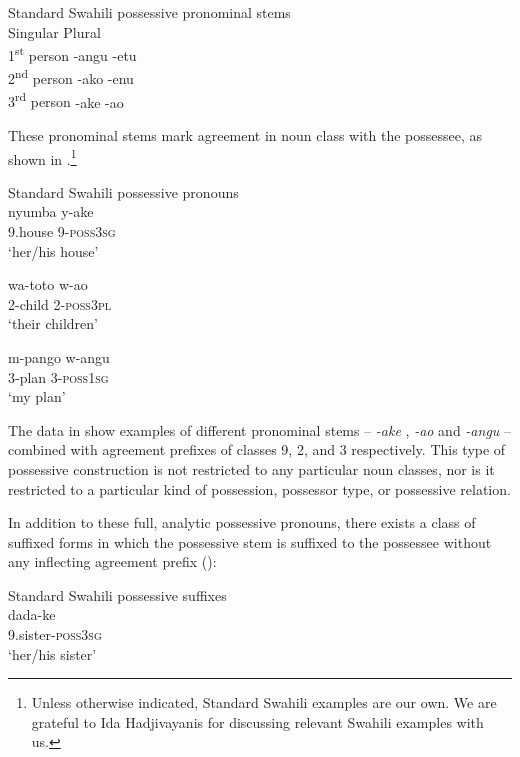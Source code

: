 \documentclass[output=paper]{langscibook}
\begin{document}
\ea\label{ex:marten:2}
Standard Swahili possessive pronominal stems \citep[55]{Ashton1947}\\
\gllll {} Singular\hspace{1ex}    Plural\\
{1\textsuperscript{st} person}      {}-angu      {}-etu\\
{2\textsuperscript{nd} person}\hspace{1ex}      {}-ako      {}-enu\\
{3\textsuperscript{rd} person}      {}-ake      {}-ao\\
\z

These pronominal stems mark agreement in noun class with the possessee, as shown in .\footnote{Unless otherwise indicated, Standard Swahili examples are our own. We are grateful to Ida Hadjivayanis for discussing relevant Swahili examples with us.}  

\ea\label{ex:marten:3}
Standard Swahili possessive pronouns \\
\ea\label{ex:marten:3a} \gll nyumba     y-ake\\
    9.house    9-\textsc{poss3sg}\\
   \glt ‘her/his house’

\ex\label{ex:marten:3b} \gll wa-toto   w-ao\\
    2-child  2-\textsc{poss3pl}\\
   \glt ‘their children’

\ex\label{ex:marten:3c} \gll m-pango  w-angu\\
    3-plan    3-\textsc{poss1sg}\\
   \glt ‘my plan’
    \z
\z

The data in  show examples of different pronominal stems -- \textit{{}-ake} , \textit{{}-ao}  and \textit{{}-angu}  -- combined with agreement prefixes of classes 9, 2, and 3 respectively. This type of possessive construction is not restricted to any particular noun classes, nor is it restricted to a particular kind of possession, possessor type, or possessive relation. 

In addition to these full, analytic possessive pronouns, there exists a class of suffixed forms in which the possessive stem is suffixed to the possessee without any inflecting agreement prefix (\cites[56]{Ashton1947}[20]{Schadeberg1992}):

\ea\label{ex:marten:4}
Standard Swahili possessive suffixes \\
\ea\label{ex:marten:4a} \gll  dada-ke \\
    9.sister-\textsc{poss3sg}\\
   \glt ‘her/his sister’
   
\end{document}
